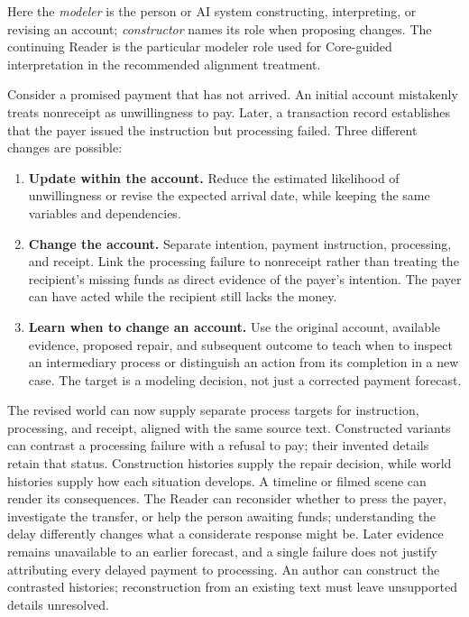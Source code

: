 \documentclass[10pt]{article}
\begin{document}
Here the \emph{modeler} is the person or AI system constructing, interpreting,
or revising an account; \emph{constructor} names its role when proposing
changes. The continuing Reader is the particular modeler role used for
Core-guided interpretation in the recommended alignment treatment.

Consider a promised payment that has not arrived. An initial account
mistakenly treats nonreceipt as unwillingness to pay. Later, a transaction
record establishes that the payer issued the instruction but processing failed.
Three different changes are possible:
\begin{enumerate}[nosep]
  \item \textbf{Update within the account.} Reduce the estimated likelihood of
    unwillingness or revise the expected arrival date, while keeping the same
    variables and dependencies.
  \item \textbf{Change the account.} Separate intention, payment instruction,
    processing, and receipt. Link the processing failure to nonreceipt rather
    than treating the recipient's missing funds as direct evidence of the
    payer's intention. The payer can have acted while the recipient still lacks
    the money.
  \item \textbf{Learn when to change an account.} Use the original account,
    available evidence, proposed repair, and subsequent outcome to teach when
    to inspect an intermediary process or distinguish an action from its
    completion in a new case. The target is a modeling decision, not just a
    corrected payment forecast.
\end{enumerate}

The revised world can now supply separate process targets for instruction,
processing, and receipt, aligned with the same source text. Constructed
variants can contrast a processing failure with a refusal to pay; their
invented details retain that status. Construction histories supply the repair
decision, while world histories supply how each situation develops. A timeline
or filmed scene can render its consequences. The Reader can reconsider whether
to press the payer, investigate the transfer, or help the person awaiting funds;
understanding the delay differently changes what a considerate response might
be. Later evidence remains unavailable to an earlier forecast, and a single
failure does not justify attributing every delayed payment to processing.
An author can construct the contrasted histories; reconstruction from an
existing text must leave unsupported details unresolved.
\end{document}
